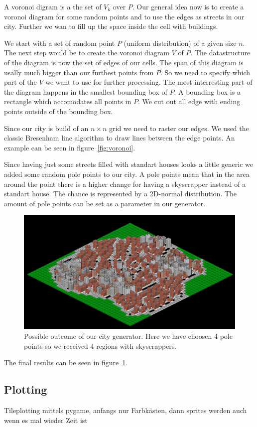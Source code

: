 \documentclass{scrartcl}
\begin{document}
A voronoi digram is a the set of $V_k$ over $P$.
Our general idea now is to create a voronoi diagram for some random points
and to use the edges as streets in our city. Further we wan to fill up the
space inside the cell with buildings.

We  start with a set of random point $P$ (uniform distribution) of a given
size $n$. The next step would be to create the voronoi diagram $V$ of $P$.
The datastructure of the diagram is now the set of edges of our cells.
The span of this diagram is usally much bigger than our furthest points from $P$.
So we need to specify which part of the $V$ we want to use for further processing.
The most interresting part of the diagram happens in the smallest bounding
box of $P$. A bounding box is a rectangle which
accomodates all points in $P$. We cut out all edge with ending points outside
of the bounding box.

Since our city is build of an $n\times n$ grid we need to raster our edges.
We used the classic Bresenham line algorithm to draw lines between the edge points.
An example can be seen in figure~\ref{fig:voronoi}.

Since having just some streets filled with standart houses looks a little
generic we added some random pole points to our city.
A pole points mean that in the area around the point there is a higher change
for having a skyscrapper instead of a standart house. The chance is represented
by a 2D-normal distribution.
The amount of pole points can be set as a parameter in our generator.

\begin{figure}
    \centering
    \includegraphics[scale = 1.2]{city1}
    \caption{Possible outcome of our city generator. Here we have choosen 4 pole
    points so we received 4 regions with skyscrappers.}
    \label{fig:city_example}
\end{figure}

The final results can be seen in figure~\ref{fig:city_example}.


\subsection{Plotting}
Tileplotting mittels pygame, anfangs nur Farbkästen, dann sprites werden auch
wenn es mal wieder Zeit ist
\end{document}
